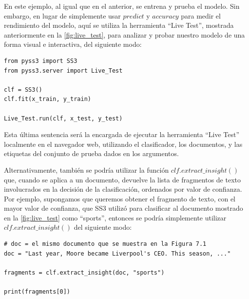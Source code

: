 En este ejemplo, al igual que en el anterior, se entrena y prueba el modelo. Sin embargo, en lugar de simplemente usar $predict$ y $accuracy$ para medir el rendimiento del modelo, aquí se utiliza la herramienta ``Live Test'', mostrada anteriormente en la \autoref{fig:live_test}, para analizar y probar nuestro modelo de una forma visual e interactiva, del siguiente modo:

\begin{verbatim}
from pyss3 import SS3
from pyss3.server import Live_Test

clf = SS3()
clf.fit(x_train, y_train)

Live_Test.run(clf, x_test, y_test)
\end{verbatim}

Esta última sentencia será la encargada de ejecutar la herramienta ``Live Test'' localmente en el navegador web, utilizando el clasificador, los documentos, y las etiquetas del conjunto de prueba dados en los argumentos.


Alternativamente, también se podría utilizar la función $clf.extract\_insight()$ que, cuando se aplica a un documento, devuelve la lista de fragmentos de texto involucrados en la decisión de la clasificación, ordenados por valor de confianza. Por ejemplo, supongamos que queremos obtener el fragmento de texto, con el mayor valor de confianza, que SS3 utilizó para clasificar al documento mostrado en la \autoref{fig:live_test} como ``sports'', entonces se podría simplemente utilizar $clf.extract\_insight()$ del siguiente modo:

\begin{verbatim}
# doc = el mismo documento que se muestra en la Figura 7.1
doc = "Last year, Moore became Liverpool's CEO. This season, ..."

fragments = clf.extract_insight(doc, "sports")

print(fragments[0])
\end{verbatim}


